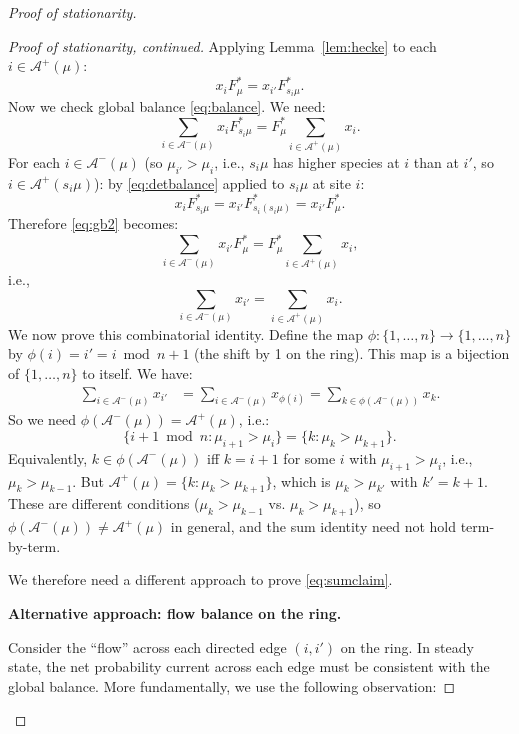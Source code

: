 \documentclass[12pt]{article}
\theoremstyle{definition}
\begin{document}
\begin{proof}[Proof of stationarity]
\begin{proof}[Proof of stationarity, continued]
Applying Lemma~\ref{lem:hecke} to each $i \in \mathcal{A}^+(\mu)$:
\[
  x_i F^*_\mu = x_{i'} F^*_{s_i\mu}.
\]
Now we check global balance \eqref{eq:balance}.  We need:
\begin{equation}\label{eq:gb2}
  \sum_{i \in \mathcal{A}^-(\mu)} x_i F^*_{s_i\mu}
  = F^*_\mu \sum_{i \in \mathcal{A}^+(\mu)} x_i.
\end{equation}
For each $i \in \mathcal{A}^-(\mu)$ (so $\mu_{i'} > \mu_i$, i.e., $s_i\mu$
has higher species at $i$ than at $i'$, so $i \in \mathcal{A}^+(s_i\mu)$):
by \eqref{eq:detbalance} applied to $s_i\mu$ at site $i$:
\[
  x_i F^*_{s_i\mu} = x_{i'} F^*_{s_i(s_i\mu)} = x_{i'} F^*_\mu.
\]
Therefore \eqref{eq:gb2} becomes:
\[
  \sum_{i \in \mathcal{A}^-(\mu)} x_{i'} F^*_\mu
  = F^*_\mu \sum_{i \in \mathcal{A}^+(\mu)} x_i,
\]
i.e.,
\[
  \sum_{i \in \mathcal{A}^-(\mu)} x_{i'} = \sum_{i \in \mathcal{A}^+(\mu)} x_i.
\]
We now prove this combinatorial identity.  Define the map $\phi : \{1,\dots,n\}
\to \{1,\dots,n\}$ by $\phi(i) = i' = i \bmod n + 1$ (the shift by 1 on the
ring).  This map is a bijection of $\{1,\dots,n\}$ to itself.  We have:
\begin{align*}
  \sum_{i \in \mathcal{A}^-(\mu)} x_{i'}
  &= \sum_{i \in \mathcal{A}^-(\mu)} x_{\phi(i)}
  = \sum_{k \in \phi(\mathcal{A}^-(\mu))} x_k.
\end{align*}
So we need $\phi(\mathcal{A}^-(\mu)) = \mathcal{A}^+(\mu)$, i.e.:
\[
  \{i + 1 \bmod n : \mu_{i+1} > \mu_i\} = \{k : \mu_k > \mu_{k+1}\}.
\]
Equivalently, $k \in \phi(\mathcal{A}^-(\mu))$ iff $k = i+1$ for some $i$
with $\mu_{i+1} > \mu_i$, i.e., $\mu_k > \mu_{k-1}$.  But
$\mathcal{A}^+(\mu) = \{k : \mu_k > \mu_{k+1}\}$, which is $\mu_k > \mu_{k'}$
with $k' = k+1$.  These are different conditions ($\mu_k > \mu_{k-1}$ vs.
$\mu_k > \mu_{k+1}$), so $\phi(\mathcal{A}^-(\mu)) \neq \mathcal{A}^+(\mu)$ in
general, and the sum identity need not hold term-by-term.

We therefore need a different approach to prove \eqref{eq:sumclaim}.

\medskip

\textbf{Alternative approach: flow balance on the ring.}

Consider the ``flow'' across each directed edge $(i, i')$ on the ring.  In
steady state, the net probability current across each edge must be consistent
with the global balance.  More fundamentally, we use the following observation:


\end{proof}
\end{proof}
\end{document}
